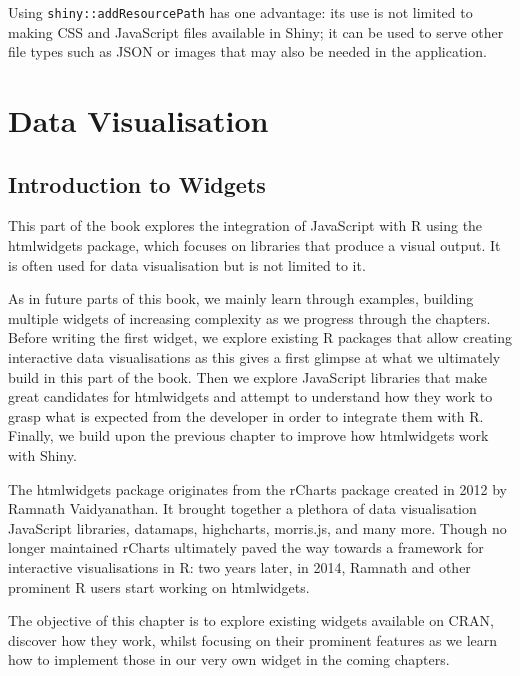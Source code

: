 \documentclass[10pt,]{krantz}
\begin{document}
Using \texttt{shiny::addResourcePath} has one advantage: its use is not limited to making CSS and JavaScript files available in Shiny; it can be used to serve other file types such as JSON or images that may also be needed in the application.

\hypertarget{part-data-visualisation}{%
\part{Data Visualisation}\label{part-data-visualisation}}

\hypertarget{widgets-intro-intro}{%
\chapter{Introduction to Widgets}\label{widgets-intro-intro}}

This part of the book explores the integration of JavaScript with R using the htmlwidgets package, which focuses on libraries that produce a visual output. It is often used for data visualisation but is not limited to it.

As in future parts of this book, we mainly learn through examples, building multiple widgets of increasing complexity as we progress through the chapters. Before writing the first widget, we explore existing R packages that allow creating interactive data visualisations as this gives a first glimpse at what we ultimately build in this part of the book. Then we explore JavaScript libraries that make great candidates for htmlwidgets and attempt to understand how they work to grasp what is expected from the developer in order to integrate them with R. Finally, we build upon the previous chapter to improve how htmlwidgets work with Shiny.

The htmlwidgets package originates from the rCharts \citep{R-rCharts} package created in 2012 by Ramnath Vaidyanathan. It brought together a plethora of data visualisation JavaScript libraries, datamaps, highcharts, morris.js, and many more. Though no longer maintained rCharts ultimately paved the way towards a framework for interactive visualisations in R: two years later, in 2014, Ramnath and other prominent R users start working on htmlwidgets.

The objective of this chapter is to explore existing widgets available on CRAN, discover how they work, whilst focusing on their prominent features as we learn how to implement those in our very own widget in the coming chapters.
\end{document}
